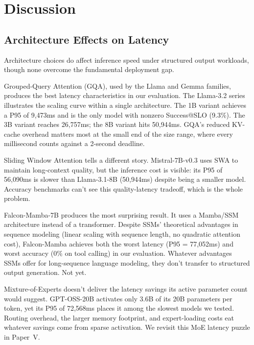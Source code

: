 \documentclass[11pt]{article}
\begin{document}
\section{Discussion}
\label{sec:discussion}

\subsection{Architecture Effects on Latency}

Architecture choices do affect inference speed under structured output workloads, though none overcome the fundamental deployment gap.

Grouped-Query Attention (GQA), used by the Llama and Gemma families, produces the best latency characteristics in our evaluation.  The Llama-3.2 series illustrates the scaling curve within a single architecture.  The 1B variant achieves a P95 of 9,473ms and is the only model with nonzero Success@SLO (9.3\%).  The 3B variant reaches 26,757ms; the 8B variant hits 50,944ms.  GQA's reduced KV-cache overhead matters most at the small end of the size range, where every millisecond counts against a 2-second deadline.

Sliding Window Attention tells a different story.  Mistral-7B-v0.3 uses SWA to maintain long-context quality, but the inference cost is visible: its P95 of 56,090ms is slower than Llama-3.1-8B (50,944ms) despite being a smaller model.  Accuracy benchmarks can't see this quality-latency tradeoff, which is the whole problem.

Falcon-Mamba-7B produces the most surprising result.  It uses a Mamba/SSM architecture instead of a transformer.  Despite SSMs' theoretical advantages in sequence modeling (linear scaling with sequence length, no quadratic attention cost), Falcon-Mamba achieves both the worst latency (P95 = 77,052ms) and worst accuracy (0\% on tool calling) in our evaluation.  Whatever advantages SSMs offer for long-sequence language modeling, they don't transfer to structured output generation.  Not yet.

Mixture-of-Experts doesn't deliver the latency savings its active parameter count would suggest.  GPT-OSS-20B activates only 3.6B of its 20B parameters per token, yet its P95 of 72,568ms places it among the slowest models we tested.  Routing overhead, the larger memory footprint, and expert-loading costs eat whatever savings come from sparse activation.  We revisit this MoE latency puzzle in Paper~V.
\end{document}
